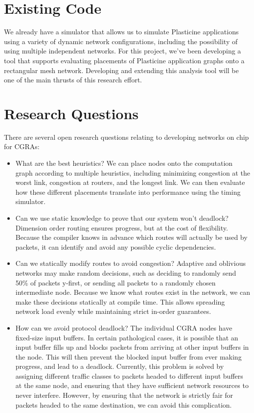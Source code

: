 \documentclass[11pt,twocolumn]{article}
\begin{document}
\section{Existing Code}
We already have a simulator that allows us to simulate Plasticine applications
using a variety of dynamic network configurations, including the possibility of
using multiple independent networks. For this project, we've been developing a
tool that supports evaluating placements of Plasticine application graphs onto
a rectangular mesh network. Developing and extending this analysis tool will be
one of the main thrusts of this research effort.

\section{Research Questions}
There are several open research questions relating to developing networks on chip for CGRAs:
\begin{itemize}
    \item What are the best heuristics? We can place nodes onto the computation
        graph according to multiple heuristics, including minimizing congestion
        at the worst link, congestion at routers, and the longest link. We can
        then evaluate how these different placements translate into performance
        using the timing simulator.
    \item Can we use static knowledge to prove that our system won't deadlock?
        Dimension order routing ensures progress, but at the cost of
        flexibility. Because the compiler knows in advance which routes will
        actually be used by packets, it can identify and avoid any possible
        cyclic dependencies.
    \item Can we statically modify routes to avoid congestion? Adaptive and
        oblivious networks may make random decisions, such as deciding to
        randomly send 50\% of packets y-first, or sending all packets to a
        randomly chosen intermediate node. Because we know what routes exist in
        the network, we can make these decisions statically at compile time.
        This allows spreading network load evenly while maintaining strict
        in-order guarantees.
    \item How can we avoid protocol deadlock? The individual CGRA nodes have
        fixed-size input buffers. In certain pathological cases, it is possible
        that an input buffer fills up and blocks packets from arriving at other
        input buffers in the node. This will then prevent the blocked input
        buffer from ever making progress, and lead to a deadlock. Currently,
        this problem is solved by assigning different traffic classes to
        packets headed to different input buffers at the same node, and
        ensuring that they have sufficient network resources to never
        interfere. However, by ensuring that the network is strictly fair for
        packets headed to the same destination, we can avoid this complication.
\end{itemize}
\end{document}
